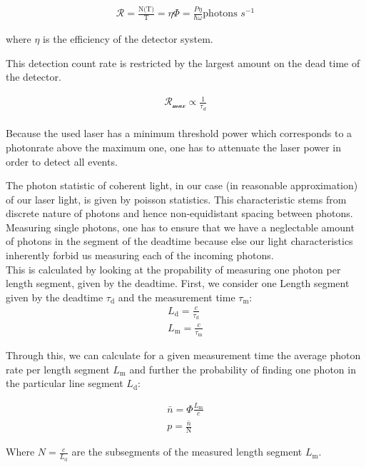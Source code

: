 \begin{align}
    \mathcal{R} = \frac{\text{N(T)}}{\text{T}} = \eta \Phi= \frac{P \eta}{\hbar \omega} \text{photons  $s^{-1}$}
\end{align}

where \textit{$\eta$} is the efficiency of the detector system.

This detection count rate is restricted by the largest amount on the dead time of the detector.

\begin{align}
    \mathcal{R_{\max}} \propto \frac{1}{\tau_{d}}
\end{align} \\

Because the used laser has a minimum threshold power which corresponds to a photonrate above the maximum one,
one has to attenuate the laser power in order to detect all events.

The photon statistic of coherent light, in our case (in reasonable approximation) of our laser light,
is given by poisson statistics.
This characteristic stems from discrete nature of photons and hence non-equidistant spacing between photons.
Measuring single photons, one has to ensure that we have a neglectable amount of photons in the segment
of the deadtime because else our light characteristics inherently forbid us measuring each of the incoming photons.\\

This is calculated by looking at the propability of measuring one photon per length segment, given by the deadtime.
First, we consider one Length segment given by the deadtime $\tau_{\text{d}}$ and the measurement time $\tau_{\text{m}}$:
\begin{align}
    L_{\text{d}} = \frac{c}{\tau_{\text{d}}}\\
    L_{\text{m}} = \frac{c}{\tau_{\text{m}}}
\end{align}

Through this, we can calculate for a given measurement time the average photon rate per length segment $L_{\text{m}}$
and further the probability of finding one photon in the particular line segment $L_{\text{d}}$:

\begin{align}
    \bar{n} = \Phi \frac{L_{\text{m}}}{c}\\
    p = \frac{\bar{n}}{\text{N}}
\end{align}

Where $N = \frac{c}{L_{\text{d}}}$ are the subsegments of the measured length segment $L_{\text{m}}$.

